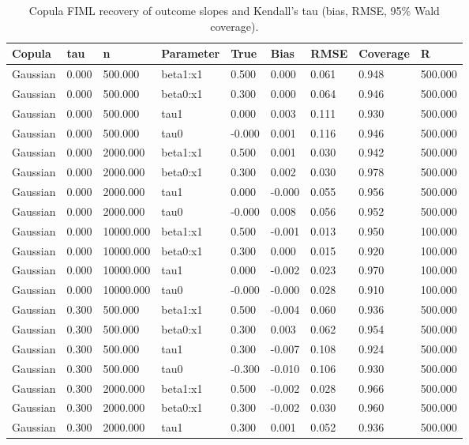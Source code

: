 \begin{table}[htbp]\centering\small
\caption{Copula FIML recovery of outcome slopes and Kendall's tau (bias, RMSE, 95\% Wald coverage).}\label{tab:mc-params}
\begin{tabular}{lllllllll}
\hline
Copula & tau & n & Parameter & True & Bias & RMSE & Coverage & R
\\ \hline
Gaussian & 0.000 & 500.000 & beta1:x1 & 0.500 & 0.000 & 0.061 & 0.948 & 500.000 \\
Gaussian & 0.000 & 500.000 & beta0:x1 & 0.300 & 0.000 & 0.064 & 0.946 & 500.000 \\
Gaussian & 0.000 & 500.000 & tau1 & 0.000 & 0.003 & 0.111 & 0.930 & 500.000 \\
Gaussian & 0.000 & 500.000 & tau0 & -0.000 & 0.001 & 0.116 & 0.946 & 500.000 \\
Gaussian & 0.000 & 2000.000 & beta1:x1 & 0.500 & 0.001 & 0.030 & 0.942 & 500.000 \\
Gaussian & 0.000 & 2000.000 & beta0:x1 & 0.300 & 0.002 & 0.030 & 0.978 & 500.000 \\
Gaussian & 0.000 & 2000.000 & tau1 & 0.000 & -0.000 & 0.055 & 0.956 & 500.000 \\
Gaussian & 0.000 & 2000.000 & tau0 & -0.000 & 0.008 & 0.056 & 0.952 & 500.000 \\
Gaussian & 0.000 & 10000.000 & beta1:x1 & 0.500 & -0.001 & 0.013 & 0.950 & 100.000 \\
Gaussian & 0.000 & 10000.000 & beta0:x1 & 0.300 & 0.000 & 0.015 & 0.920 & 100.000 \\
Gaussian & 0.000 & 10000.000 & tau1 & 0.000 & -0.002 & 0.023 & 0.970 & 100.000 \\
Gaussian & 0.000 & 10000.000 & tau0 & -0.000 & -0.000 & 0.028 & 0.910 & 100.000 \\
Gaussian & 0.300 & 500.000 & beta1:x1 & 0.500 & -0.004 & 0.060 & 0.936 & 500.000 \\
Gaussian & 0.300 & 500.000 & beta0:x1 & 0.300 & 0.003 & 0.062 & 0.954 & 500.000 \\
Gaussian & 0.300 & 500.000 & tau1 & 0.300 & -0.007 & 0.108 & 0.924 & 500.000 \\
Gaussian & 0.300 & 500.000 & tau0 & -0.300 & -0.010 & 0.106 & 0.930 & 500.000 \\
Gaussian & 0.300 & 2000.000 & beta1:x1 & 0.500 & -0.002 & 0.028 & 0.966 & 500.000 \\
Gaussian & 0.300 & 2000.000 & beta0:x1 & 0.300 & -0.002 & 0.030 & 0.960 & 500.000 \\
Gaussian & 0.300 & 2000.000 & tau1 & 0.300 & 0.001 & 0.052 & 0.936 & 500.000 \\

\end{tabular}
\end{table}
